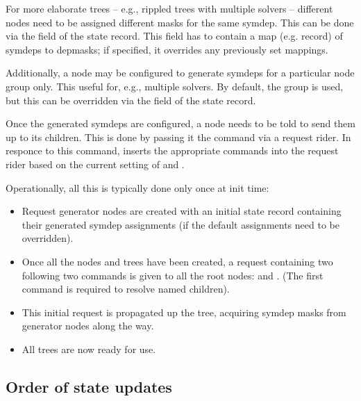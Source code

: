   For more elaborate trees -- e.g., rippled trees with multiple solvers --
  different  nodes need to be assigned different masks for the same
  symdep. This can be done via the  field of the state record.
  This field has to contain a map (e.g. record) of symdeps to depmasks; if
  specified, it overrides any previously set mappings. 
  
  Additionally, a node may be configured to generate symdeps for a particular
  node group only. This useful for, e.g., multiple solvers. By default, the
   group is used, but this can be overridden via the
   field of the state record.

  Once the generated symdeps are configured, a node needs to be told to send
  them up to its children. This is done by passing it the 
  command via a request rider. In responce to this command,
   inserts the appropriate  commands
  into the request rider based on the current setting of  and
  .
  
  Operationally, all this is typically done only once at init time:
  
  \begin{itemize}
  
  \item Request generator nodes are created with an initial state record
    containing their generated symdep assignments (if the default assignments
    need to be overridden).
    
  \item Once all the nodes and trees have been created, a request containing
    two following two commands is given to all the root nodes:
     and . (The first command is
    required to resolve named children).
    
  \item This initial request is propagated up the tree, acquiring symdep masks
    from generator nodes along the way. 
    
  \item All trees are now ready for use.
  
  \end{itemize}

\subsection{Order of state updates}

